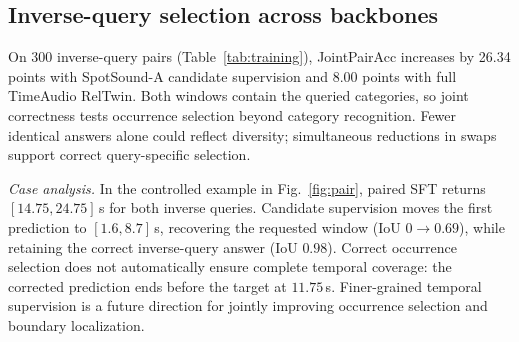 \subsection{Inverse-query selection across backbones}
On 300 inverse-query pairs (Table~\ref{tab:training}), JointPairAcc increases by 26.34 points with SpotSound-A candidate supervision and 8.00 points with full TimeAudio RelTwin. Both windows contain the queried categories, so joint correctness tests occurrence selection beyond category recognition. Fewer identical answers alone could reflect diversity; simultaneous reductions in swaps support correct query-specific selection.

\textit{Case analysis.} In the controlled example in Fig.~\ref{fig:pair}, paired SFT returns $[14.75,24.75]$\,s for both inverse queries. Candidate supervision moves the first prediction to $[1.6,8.7]$\,s, recovering the requested window (IoU $0\rightarrow0.69$), while retaining the correct inverse-query answer (IoU $0.98$). Correct occurrence selection does not automatically ensure complete temporal coverage: the corrected prediction ends before the target at $11.75$\,s. Finer-grained temporal supervision is a future direction for jointly improving occurrence selection and boundary localization.

